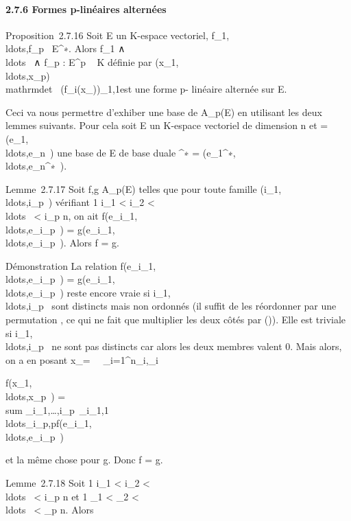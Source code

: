 \documentclass[]{article}
\begin{document}
\paragraph{2.7.6 Formes p-linéaires alternées}

Proposition~2.7.16 Soit E un K-espace vectoriel,
f\_1,\\ldots,f\_p~
\in E^∗. Alors f\_1
∧\\ldots~ ∧
f\_p : E^p \rightarrow~ K définie par
(x\_1,\\ldots,x\_p)\mapsto~\\mathrm{det}~
(f\_i(x\_\jmath))\_1\leqi\leqp,1\leq\jmath\leqp est une forme p-
linéaire alternée sur E.

Ceci va nous permettre d'exhiber une base de A\_p(E) en
utilisant les deux lemmes suivants. Pour cela soit E un K-espace
vectoriel de dimension n et  =
(e\_1,\\ldots,e\_n~)
une base de E de base duale ^∗ =
(e\_1^∗,\\ldots,e\_n^∗~).

Lemme~2.7.17 Soit f,g \in A\_p(E) telles que pour toute famille
(i\_1,\\ldots,i\_p~)
vérifiant 1 \leq i\_1 \textless{} i\_2 \textless{}
\\ldots~ \textless{}
i\_p \leq n, on ait
f(e\_i\_1,\\ldots,e\_i\_p~)
=
g(e\_i\_1,\\ldots,e\_i\_p~).
Alors f = g.

Démonstration La relation
f(e\_i\_1,\\ldots,e\_i\_p~)
=
g(e\_i\_1,\\ldots,e\_i\_p~)
reste encore vraie si
i\_1,\\ldots,i\_p~
sont distincts mais non ordonnés (il suffit de les réordonner par une
permutation \sigma, ce qui ne fait que multiplier les deux côtés par \epsilon(\sigma)).
Elle est triviale si
i\_1,\\ldots,i\_p~
ne sont pas distincts car alors les deux membres valent 0. Mais alors,
on a en posant x\_\jmath =\
\sum ~
\_i=1^n\xi\_i,\jmathe\_i

f(x\_1,\\ldots,x\_p~)
= \\sum
\_i\_1,\ldots,i\_p\in{}~\xi\_i\_1,1\\ldots\xi\_i\_p,pf(e\_i\_1,\\ldots,e\_i\_p~)

et la même chose pour g. Donc f = g.

Lemme~2.7.18 Soit 1 \leq i\_1 \textless{} i\_2 \textless{}
\\ldots~ \textless{}
i\_p \leq n et 1 \leq \jmath\_1 \textless{} \jmath\_2
\textless{} \\ldots~
\textless{} \jmath\_p \leq n. Alors
\end{document}
